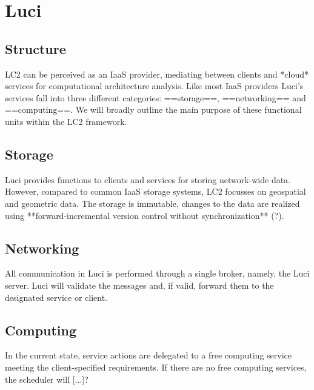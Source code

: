 \section{Luci}
\label{ch:luci}

\subsection{Structure}
\label{sec:luci:structure}
LC2 can be perceived as an IaaS provider, mediating between clients and *cloud* services for computational architecture analysis. Like most IaaS providers Luci's services fall into three different categories: ==storage==, ==networking== and ==computing==. We will broadly outline the main purpose of these functional units within the LC2 framework.

\subsection{Storage}
\label{sec:luci:structure:storage}
Luci provides functions to clients and services for storing network-wide data. However, compared to common IaaS storage systems, LC2 focusses on geospatial and geometric data. The storage is immutable, changes to the data are realized using **forward-incremental version control without synchronization** (?).

\subsection{Networking}
\label{sec:luci:structure:networking}
All communication in Luci is performed through a single broker, namely, the Luci server. Luci will validate the messages and, if valid, forward them to the designated service or client.

\subsection{Computing}
\label{sec:luci:structure:computing}
In the current state, service actions are delegated to a free computing service meeting the client-specified requirements. If there are no free computing services, the scheduler will [...]?
